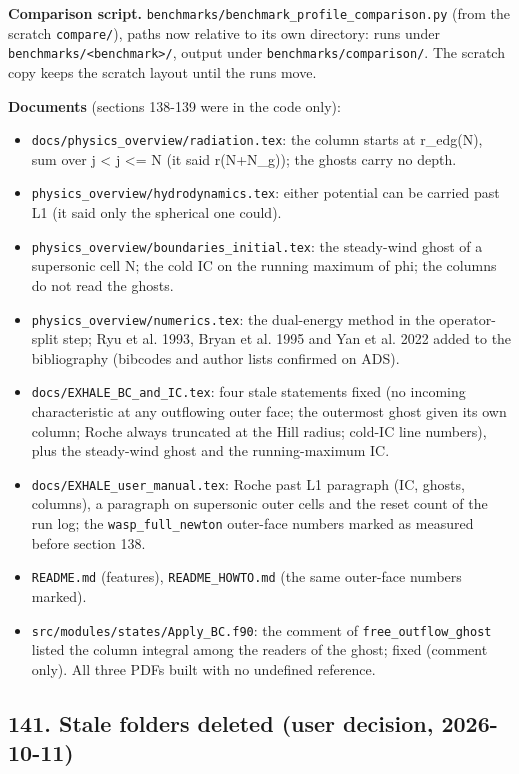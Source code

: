 \documentclass[english,a4paper]{my_memo}
\providecommand{\tightlist}{\setlength{\itemsep}{0pt}\setlength{\parskip}{0pt}}
\begin{document}
\textbf{Comparison script.} \texttt{benchmarks/benchmark\_profile\_comparison.py} (from the scratch \texttt{compare/}), paths now relative to its own directory: runs under \texttt{benchmarks/\textless{}benchmark\textgreater{}/}, output under \texttt{benchmarks/comparison/}. The scratch copy keeps the scratch layout until the runs move.

\textbf{Documents} (sections 138-139 were in the code only):

\begin{itemize}
\tightlist
\item
  \texttt{docs/physics\_overview/radiation.tex}: the column starts at r\_edg(N), sum over j \textless{} j\textquotesingle{} \textless= N (it said r(N+N\_g)); the ghosts carry no depth.
\item
  \texttt{physics\_overview/hydrodynamics.tex}: either potential can be carried past L1 (it said only the spherical one could).
\item
  \texttt{physics\_overview/boundaries\_initial.tex}: the steady-wind ghost of a supersonic cell N; the cold IC on the running maximum of phi; the columns do not read the ghosts.
\item
  \texttt{physics\_overview/numerics.tex}: the dual-energy method in the operator-split step; Ryu et al. 1993, Bryan et al. 1995 and Yan et al. 2022 added to the bibliography (bibcodes and author lists confirmed on ADS).
\item
  \texttt{docs/EXHALE\_BC\_and\_IC.tex}: four stale statements fixed (no incoming characteristic at any outflowing outer face; the outermost ghost given its own column; Roche always truncated at the Hill radius; cold-IC line numbers), plus the steady-wind ghost and the running-maximum IC.
\item
  \texttt{docs/EXHALE\_user\_manual.tex}: Roche past L1 paragraph (IC, ghosts, columns), a paragraph on supersonic outer cells and the reset count of the run log; the \texttt{wasp\_full\_newton} outer-face numbers marked as measured before section 138.
\item
  \texttt{README.md} (features), \texttt{README\_HOWTO.md} (the same outer-face numbers marked).
\item
  \texttt{src/modules/states/Apply\_BC.f90}: the comment of \texttt{free\_outflow\_ghost} listed the column integral among the readers of the ghost; fixed (comment only).
  All three PDFs built with no undefined reference.
\end{itemize}

\subsection{141. Stale folders deleted (user decision, 2026-10-11)}\label{141-stale-folders-deleted-user-decision-2026-10-11}
\end{document}
